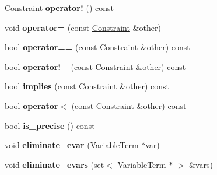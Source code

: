 \begin{DoxyCompactItemize}
\item 
\hypertarget{classConstraint_a8f3d1d88c700cc778ab890d1a988beed}{\hyperlink{classConstraint}{\-Constraint} {\bfseries operator!} () const }\label{classConstraint_a8f3d1d88c700cc778ab890d1a988beed}

\item 
\hypertarget{classConstraint_a746cad20bfc4255820a3cc3333510f16}{void {\bfseries operator=} (const \hyperlink{classConstraint}{\-Constraint} \&other)}\label{classConstraint_a746cad20bfc4255820a3cc3333510f16}

\item 
\hypertarget{classConstraint_a8413aac9584a56afe3ab6d5038d3509a}{bool {\bfseries operator==} (const \hyperlink{classConstraint}{\-Constraint} \&other) const }\label{classConstraint_a8413aac9584a56afe3ab6d5038d3509a}

\item 
\hypertarget{classConstraint_a1d1067202e358f77ba72c4237b858f11}{bool {\bfseries operator!=} (const \hyperlink{classConstraint}{\-Constraint} \&other) const }\label{classConstraint_a1d1067202e358f77ba72c4237b858f11}

\item 
\hypertarget{classConstraint_ad74afe376931ccf0940c5cc60695536c}{bool {\bfseries implies} (const \hyperlink{classConstraint}{\-Constraint} \&other) const }\label{classConstraint_ad74afe376931ccf0940c5cc60695536c}

\item 
\hypertarget{classConstraint_a5836c0cfb47c3b6e61e2e99aa0893844}{bool {\bfseries operator$<$} (const \hyperlink{classConstraint}{\-Constraint} \&other) const }\label{classConstraint_a5836c0cfb47c3b6e61e2e99aa0893844}

\item 
\hypertarget{classConstraint_abe0d7e5f041e55fd5aacefbc1815b2a1}{bool {\bfseries is\-\_\-precise} () const }\label{classConstraint_abe0d7e5f041e55fd5aacefbc1815b2a1}

\item 
\hypertarget{classConstraint_a184cc1e313635131947554b72ae3faa9}{void {\bfseries eliminate\-\_\-evar} (\hyperlink{classVariableTerm}{\-Variable\-Term} $\ast$var)}\label{classConstraint_a184cc1e313635131947554b72ae3faa9}

\item 
\hypertarget{classConstraint_a2b3387858256afd188257eaa009da16d}{void {\bfseries eliminate\-\_\-evars} (set$<$ \hyperlink{classVariableTerm}{\-Variable\-Term} $\ast$ $>$ \&vars)}\label{classConstraint_a2b3387858256afd188257eaa009da16d}


\end{DoxyCompactItemize}
